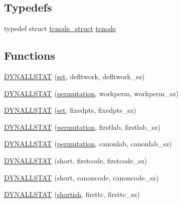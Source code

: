 \subsection*{Typedefs}
\begin{DoxyCompactItemize}
\item 
typedef struct \mbox{\hyperlink{structtcnode__struct}{tcnode\+\_\+struct}} \mbox{\hyperlink{_l_i_b_2_g_a_l_o_i_s_2nauty_8_c_a25a2b08a0b89983fe0cd385efff6a3fb}{tcnode}}
\end{DoxyCompactItemize}
\subsection*{Functions}
\begin{DoxyCompactItemize}
\item 
\mbox{\hyperlink{_l_i_b_2_g_a_l_o_i_s_2nauty_8_c_a78b2a8c66b8a010c163c1ee54a286c25}{D\+Y\+N\+A\+L\+L\+S\+T\+AT}} (\mbox{\hyperlink{nauty_8h_a9690bea211101f22a5e154087590c3da}{set}}, defltwork, defltwork\+\_\+sz)
\item 
\mbox{\hyperlink{_l_i_b_2_g_a_l_o_i_s_2nauty_8_c_aa018f375fe97502d71a3c0e9d9fdb19d}{D\+Y\+N\+A\+L\+L\+S\+T\+AT}} (\mbox{\hyperlink{classpermutation}{permutation}}, workperm, workperm\+\_\+sz)
\item 
\mbox{\hyperlink{_l_i_b_2_g_a_l_o_i_s_2nauty_8_c_a845ace27e6e563a3a498f7a6e0d060ea}{D\+Y\+N\+A\+L\+L\+S\+T\+AT}} (\mbox{\hyperlink{nauty_8h_a9690bea211101f22a5e154087590c3da}{set}}, fixedpts, fixedpts\+\_\+sz)
\item 
\mbox{\hyperlink{_l_i_b_2_g_a_l_o_i_s_2nauty_8_c_a2620277eec9d65559409f06b4ebe2699}{D\+Y\+N\+A\+L\+L\+S\+T\+AT}} (\mbox{\hyperlink{classpermutation}{permutation}}, firstlab, firstlab\+\_\+sz)
\item 
\mbox{\hyperlink{_l_i_b_2_g_a_l_o_i_s_2nauty_8_c_a180c4677972454eb03e9dc5de50e4245}{D\+Y\+N\+A\+L\+L\+S\+T\+AT}} (\mbox{\hyperlink{classpermutation}{permutation}}, canonlab, canonlab\+\_\+sz)
\item 
\mbox{\hyperlink{_l_i_b_2_g_a_l_o_i_s_2nauty_8_c_a015a1c19656cf7daf319300e3bb49d8a}{D\+Y\+N\+A\+L\+L\+S\+T\+AT}} (short, firstcode, firstcode\+\_\+sz)
\item 
\mbox{\hyperlink{_l_i_b_2_g_a_l_o_i_s_2nauty_8_c_a8c872d4888eff77fa80218ca6a2a52f9}{D\+Y\+N\+A\+L\+L\+S\+T\+AT}} (short, canoncode, canoncode\+\_\+sz)
\item 
\mbox{\hyperlink{_l_i_b_2_g_a_l_o_i_s_2nauty_8_c_a663668e0ac94cab6df2c4bd968fa1811}{D\+Y\+N\+A\+L\+L\+S\+T\+AT}} (\mbox{\hyperlink{nauty_8h_a873fc7d1a7532fac6c451f9ec8ee2469}{shortish}}, firsttc, firsttc\+\_\+sz)

\end{DoxyCompactItemize}
